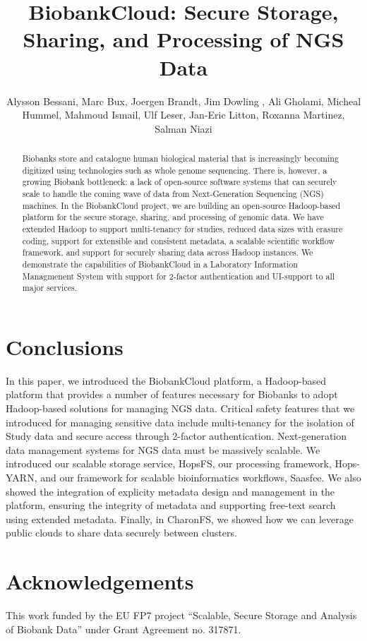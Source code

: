 \documentclass[a4paper,english]{llncs}
\title{BiobankCloud: Secure Storage, Sharing, and Processing of NGS Data}
\author{Alysson Bessani\inst{5}, Marc Bux\inst{2}, Joergen Brandt\inst{2}, Jim Dowling \inst{1}, Ali Gholami\inst{1}, Micheal Hummel\inst{4}, Mahmoud Ismail\inst{1}, Ulf Leser\inst{2}, Jan-Eric Litton\inst{3}, Roxanna Martinez\inst{3}, Salman Niazi\inst{1}}
\institute{KTH - Royal Institute of Technology,\\
\email{\{jdowling, gholami, maism, smkniazi\}@kth.se}
\and
Humboldt University\\
\email{\{leser, bux, joergen.brandt\}@informatik.hu-berlin.de}
\and
Karolinska Institute\\
\email{\{Jan-Eric.Litton, Roxanna.Martinez\}@ki.se}
\and
Charite\\
\email{\{Michael.Hummel\}@charite.de}
\and
University of Lisbon\\
\email{\{bessani\}@di.fc.ul.pt}
}
\begin{document}
\maketitle

\begin{abstract}
Biobanks store and catalogue human biological material that is increasingly becoming digitized using technologies such as whole genome sequencing. There is, however, a growing Biobank bottleneck: a lack of open-source software systems that can securely scale to handle the coming wave of data from Next-Generation Sequencing (NGS) machines. In the BiobankCloud project, we are building an open-source Hadoop-based platform for the secure storage, sharing, and processing of genomic data. We have extended Hadoop to support multi-tenancy for studies, reduced data sizes with erasure coding, support for extensible and consistent metadata, a scalable scientific workflow framework, and support for securely sharing data across Hadoop instances. We demonstrate the capabilities of BiobankCloud in a Laboratory Information Managmenent System with support for 2-factor authentication and UI-support to all major services.

\end{abstract}













\section{Conclusions}
In this paper, we introduced the BiobankCloud platform, a Hadoop-based platform that provides a number of features necessary for Biobanks to adopt Hadoop-based solutions for managing NGS data. Critical safety features that we introduced for managing sensitive data include multi-tenancy for the isolation of Study data and secure access through 2-factor authentication. Next-generation data management systems for NGS data must be massively scalable. We introduced our scalable storage service, HopsFS, our processing framework, Hops-YARN, and our framework for scalable bioinformatics workflows, Saasfee. We also showed the integration of explicity metadata design and management in the platform, ensuring the integrity of metadata and supporting free-text search using extended metadata. Finally, in CharonFS, we showed how we can leverage public clouds to share data securely between clusters.

\section{Acknowledgements}
This work funded by the EU FP7 project ``Scalable, Secure Storage and Analysis of Biobank Data'' under Grant Agreement no. 317871. 


\end{document}
